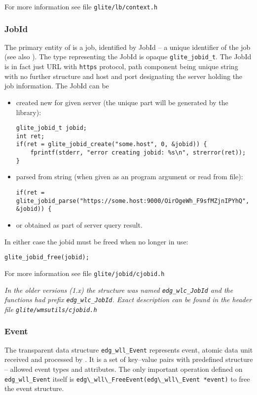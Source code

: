 For more information see file \verb'glite/lb/context.h'

\subsubsection{JobId} 
The primary entity of \LB is a job, identified by JobId -- a unique
identifier of the job (see also \cite{lbug}). The type representing
the JobId is opaque \verb'glite_jobid_t'. The JobId is in fact
just URL with \verb'https' protocol, path component being unique string
with no further structure and host and port designating the \LB server
holding the job information. The JobId can be
\begin{itemize}
\item created new for given \LB server (the unique part will be
generated by the \LB library):
\begin{lstlisting}
glite_jobid_t jobid;
int ret; 
if(ret = glite_jobid_create("some.host", 0, &jobid)) {
	fprintf(stderr, "error creating jobid: %s\n", strerror(ret));
}
\end{lstlisting}
\item parsed from string (\eg when given as an program argument or
read from file):
\begin{lstlisting}[firstnumber=3]
if(ret = glite_jobid_parse("https://some.host:9000/OirOgeWh_F9sfMZjnIPYhQ", &jobid)) {
\end{lstlisting}
\item or obtained as part of \LB server query result.
\end{itemize}
In either case the jobid must be freed when no longer in use:
\begin{lstlisting}
glite_jobid_free(jobid);
\end{lstlisting}

For more information see file \verb'glite/jobid/cjobid.h'

%
{\it In the older \LB versions (1.x) the
structure was named \verb'edg_wlc_JobId' and the functions had prefix
\verb'edg_wlc_JobId'. Exact description can be found in the
header file \verb'glite/wmsutils/cjobid.h'}


\subsubsection{Event}
\label{s:edg_wll_Event}
The transparent data structure \verb'edg_wll_Event' represents \LB
event, atomic data unit received and processed by \LB. It is a set of
key--value pairs with predefined structure -- allowed event types and
attributes. The only important operation defined on
\verb'edg_wll_Event' itself is
\lstinline{edg\_wll\_FreeEvent(edg\_wll\_Event *event)} to free the
event structure. 


